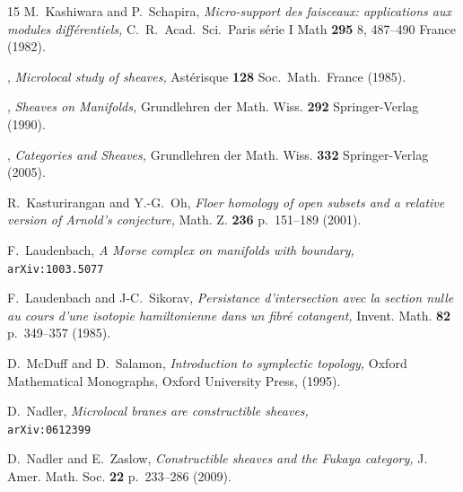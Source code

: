 \documentclass[12pt,leqno]{article}
\theoremstyle{definition}
\numberwithin{equation}{section}
\begin{document}
\begin{thebibliography}{15}
 M.~Kashiwara and P.~Schapira,
{\em Micro-support des faisceaux: applications aux modules diff{\'e}rentiels,}
C.~R.~Acad.\ Sci.\ Paris s{\'e}rie I Math {\bf 295} 8, 487--490 France (1982).

 \bysame,
{\em Microlocal study of sheaves,}
Ast{\'e}risque {\bf 128} Soc.\ Math.\ France (1985).

 \bysame,
{\em Sheaves on Manifolds,}
\/Grundlehren der Math. Wiss. {\bf 292} Springer-Verlag (1990).
                                                                 
  \bysame,
{\em Categories and Sheaves,}
\/Grundlehren  der Math. Wiss. {\bf 332} Springer-Verlag (2005).





 R.~Kasturirangan and Y.-G.~Oh,
{\em Floer homology of open subsets and a relative version of Arnold's
 conjecture,}
Math. Z.  {\bf 236} p.~151--189  (2001).

 F.~Laudenbach,
{\em A Morse complex on manifolds with boundary,}\\
\/\texttt{arXiv:1003.5077}

 F.~Laudenbach and J-C.~Sikorav,
{\em Persistance d'intersection avec la section nulle au cours d'une
isotopie hamiltonienne dans un fibr{\'e} cotangent,}
Invent. Math. {\bf 82}  p.~349--357 (1985).

 D.~McDuff and D.~Salamon,
{\em Introduction to symplectic topology,}
Oxford Mathematical Monographs, Oxford University Press, (1995).

 D.~Nadler,
{\em Microlocal branes are constructible sheaves,} \\
\/\texttt{arXiv:0612399 }

 D.~Nadler and E.~Zaslow, 
{\em Constructible sheaves and the Fukaya category,}
J. Amer. Math. Soc. {\bf 22} p.~233--286 (2009).


\end{thebibliography}
\end{document}
